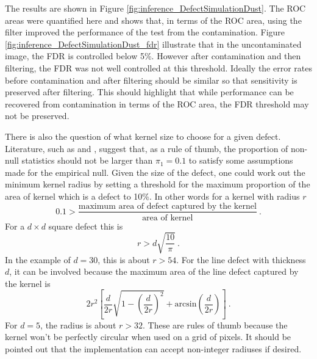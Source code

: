 The results are shown in Figure \ref{fig:inference_DefectSimulationDust}. The ROC areas were quantified here and shows that, in terms of the ROC area, using the filter improved the performance of the test from the contamination. Figure \ref{fig:inference_DefectSimulationDust_fdr} illustrate that in the uncontaminated image, the FDR is controlled below 5\%. However after contamination and then filtering, the FDR was not well controlled at this threshold. Ideally the error rates before contamination and after filtering should be similar so that sensitivity is preserved after filtering. This should highlight that while performance can be recovered from contamination in terms of the ROC area, the FDR threshold may not be preserved.

There is also the question of what kernel size to choose for a given defect. Literature, such as \cite{efron2004large} and \cite{schwartzman2008empirical}, suggest that, as a rule of thumb, the proportion of non-null statistics should not be larger than $\pi_1=0.1$ to satisfy some assumptions made for the empirical null. Given the size of the defect, one could work out the minimum kernel radius by setting a threshold for the maximum proportion of the area of kernel which is a defect to 10\%. In other words for a kernel with radius $r$
\begin{equation}
0.1 > \dfrac{\text{maximum area of defect captured by the kernel}}{\text{area of kernel}} \ .
\end{equation}
For a $d \times d$ square defect this is
\begin{equation}
r > d \sqrt{\dfrac{10}{\pi}} \ .
\end{equation}
In the example of $d=30$, this is about $r>54$. For the line defect with thickness $d$, it can be involved because the maximum area of the line defect captured by the kernel is
\begin{equation}
2r^2
\left[
	\dfrac{d}{2r}\sqrt{1-\left(\dfrac{d}{2r}\right)^2}
	+\text{arcsin}\left(\dfrac{d}{2r}\right)
\right] \ .
\end{equation}
For $d=5$, the radius is about $r>32$. These are rules of thumb because the kernel won't be perfectly circular when used on a grid of pixels. It should be pointed out that the implementation can accept non-integer radiuses if desired.

